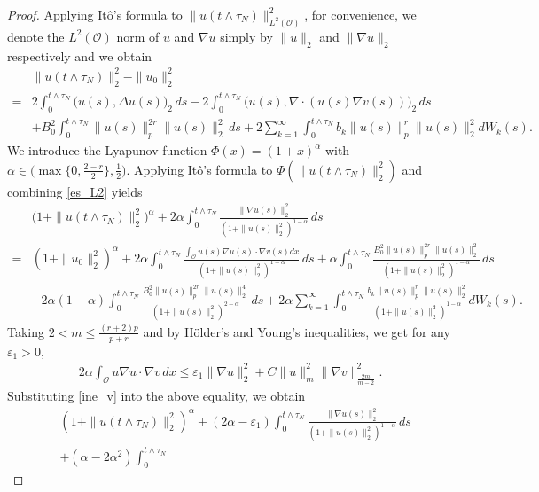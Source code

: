\documentclass[10pt,a4paper]{amsart}
\begin{document}
  \begin{proof}
    	 Applying It\^o's formula to $\|u(t\wedge{\tau_N})\|_{L^2(\mathcal O)}^2$, for convenience, we denote the $L^2(\mathcal{O})$ norm of $u$ and $\nabla u$  simply by $\|u\|_2$ and $\|\nabla u\|_2$ respectively and we obtain
        \begin{align}\label{es_L2}
		\nonumber&\|u(t\wedge{\tau_N})\|_2^2-\|u_0\|_2^2\\
		=&2\int_0^{t\wedge{\tau_N}}\big(u(s),\Delta u(s)\big)_2\,ds
		-2\int_0^{t\wedge{\tau_N}}\big(u(s),\nabla\cdot(u(s)\nabla v(s))\big)_2\,ds
		\nonumber\\
&+B_0^2\int_0^{t\wedge{\tau_N}}\|u(s)\|_p^{2r}\|u(s)\|_2^2\,ds+2\sum_{k=1}^\infty\int_0^{t\wedge{\tau_N}}b_k\|u(s)\|_p^r\|u(s)\|_2^2dW_k(s).
	\end{align}
  We introduce the Lyapunov function $\Phi(x)=(1+x)^\alpha$ with $\alpha\in\big(\max\{0,\frac{2-r}{2}\},\frac{1}{2}\big).$ Applying It\^o's formula to $\Phi(\|u(t\wedge{\tau_N})\|_2^2)$ and combining \eqref{es_L2} yields
	\begin{align*}
		\nonumber&\big(1+\|u(t\wedge{\tau_N})\|_2^2\big)^\alpha
+2\alpha\int_0^{t\wedge{\tau_N}}\frac{\|\nabla u(s)\|_2^2}{(1+\|u(s)\|_2^2)^{1-\alpha}}\,ds
		\\\nonumber
		=&(1+\|u_0\|_2^2)^\alpha
		+2\alpha\int_0^{t\wedge{\tau_N}}
		\frac{\int_{\mathcal O}u(s)\nabla u(s)\cdot \nabla v(s)dx}
		{(1+\|u(s)\|_2^2)^{1-\alpha}}\,ds
+\alpha\int_0^{t\wedge{\tau_N}}
		\frac{B_0^2\|u(s)\|_p^{2r}\|u(s)\|_2^2}
		{(1+\|u(s)\|_2^2)^{1-\alpha}}\,ds
		\\
		&-2\alpha(1-\alpha)\int_0^{t\wedge{\tau_N}}
		\frac{{B_0^2}\|u(s)\|_p^{2r}\|u(s)\|_2^4}
		{(1+\|u(s)\|_2^2)^{2-\alpha}}\,ds
+2\alpha\sum_{k=1}^\infty\int_0^{t\wedge{\tau_N}}
		\frac{b_k\|u(s)\|_p^r\|u(s)\|_2^2}
		{(1+\|u(s)\|_2^2)^{1-\alpha}}dW_k(s).
	\end{align*}
    Taking $2<m\le \frac{(r+2)p}{p+r}$ and  by H\"older's and Young's inequalities,  we get  for any $\varepsilon_1>0$,
	\begin{align}\label{ine_v}
	    2\alpha\int_{\mathcal O}u\nabla u\cdot \nabla v\,dx
	\le
	\varepsilon_1\|\nabla u\|_2^2
	+C\|u\|_m^2\|\nabla v\|_{\frac{2m}{m-2}}^2.
	\end{align}
	Substituting \eqref{ine_v} into the above equality, we obtain
	\begin{align}
		\label{L3}
		\nonumber&(1+\|u(t\wedge{\tau_N})\|_2^2)^\alpha
		+(2\alpha-\varepsilon_1)\int_0^{t\wedge{\tau_N}}\frac{\|\nabla u(s)\|_2^2}{(1+\|u(s)\|_2^2)^{1-\alpha}}\,ds\\\nonumber&+(\alpha-2\alpha^2)\int_0^{t\wedge{\tau_N}}

\end{align}
\end{proof}
\end{document}
